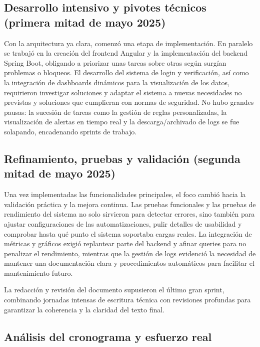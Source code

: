 \documentclass[11pt,a4paper,twoside]{report}
\begin{document}
\subsection{Desarrollo intensivo y pivotes técnicos (primera mitad de mayo 2025)}

Con la arquitectura ya clara, comenzó una etapa de implementación. En paralelo se trabajó en la creación del frontend Angular y la implementación del backend Spring Boot, obligando a priorizar unas tareas sobre otras según surgían problemas o bloqueos. El desarrollo del sistema de login y verificación, así como la integración de dashboards dinámicos para la visualización de los datos, requirieron investigar soluciones y adaptar el sistema a nuevas necesidades no previstas y soluciones que cumplieran con normas de seguridad. No hubo grandes pausas: la sucesión de tareas como la gestión de reglas personalizadas, la visualización de alertas en tiempo real y la descarga/archivado de logs se fue solapando, encadenando sprints de trabajo.

\subsection{Refinamiento, pruebas y validación (segunda mitad de mayo 2025)}

Una vez implementadas las funcionalidades principales, el foco cambió hacia la validación práctica y la mejora continua. Las pruebas funcionales y las pruebas de rendimiento del sistema no solo sirvieron para detectar errores, sino también para ajustar configuraciones de las automatizaciones, pulir detalles de usabilidad y comprobar hasta qué punto el sistema soportaba cargas reales. La integración de métricas y gráficos exigió replantear parte del backend y afinar queries para no penalizar el rendimiento, mientras que la gestión de logs evidenció la necesidad de mantener una documentación clara y procedimientos automáticos para facilitar el mantenimiento futuro.\newline

La redacción y revisión del documento supusieron el último gran sprint, combinando jornadas intensas de escritura técnica con revisiones profundas para garantizar la coherencia y la claridad del texto final.

\subsection{Análisis del cronograma y esfuerzo real}
\end{document}
